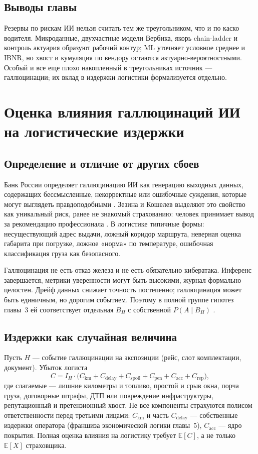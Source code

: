 \documentclass[a4paper,14pt]{extarticle}
\begin{document}
\subsection{Выводы главы}

Резервы по рискам ИИ нельзя считать тем же треугольником, что и по каско водителя. Микроданные, двухчастные модели Вербика, якорь chain-ladder и контроль актуария \cite{sabitov} образуют рабочий контур; ML уточняет условное среднее и IBNR, но хвост и кумуляция по вендору остаются актуарно-вероятностными. Особый и все еще плохо накопленный в треугольниках источник --- галлюцинации; их вклад в издержки логистики формализуется отдельно.

\section{Оценка влияния галлюцинаций ИИ на логистические издержки}

\subsection{Определение и отличие от других сбоев}

Банк России определяет галлюцинацию ИИ как генерацию выходных данных, содержащих бессмысленные, некорректные или ошибочные суждения, которые могут выглядеть правдоподобными \cite{cbr}. Зезина и Кошелев выделяют это свойство как уникальный риск, ранее не знакомый страхованию: человек принимает вывод за рекомендацию профессионала \cite{zezina}. В логистике типичные формы: несуществующий адрес выдачи, ложный коридор маршрута, неверная оценка габарита при погрузке, ложное «норма» по температуре, ошибочная классификация груза как безопасного.

Галлюцинация не есть отказ железа и не есть обязательно кибератака. Инференс завершается, метрики уверенности могут быть высокими, журнал формально целостен. Дрейф данных снижает точность постепенно; галлюцинация может быть единичным, но дорогим событием. Поэтому в полной группе гипотез главы~3 ей соответствует отдельная $B_H$ с собственной $P(A\mid B_H)$ \cite{shvedov}.

\subsection{Издержки как случайная величина}

Пусть $H$ --- событие галлюцинации на экспозиции (рейс, слот комплектации, документ). Убыток логиста
\begin{equation}
C=I_H\cdot\bigl(C_{\mathrm{km}}+C_{\mathrm{delay}}+C_{\mathrm{spoil}}+C_{\mathrm{pen}}+C_{\mathrm{acc}}+C_{\mathrm{rep}}\bigr),
\label{eq:hallc}
\end{equation}
где слагаемые --- лишние километры и топливо, простой и срыв окна, порча груза, договорные штрафы, ДТП или повреждение инфраструктуры, репутационный и претензионный хвост. Не все компоненты страхуются полисом ответственности перед третьими лицами: $C_{\mathrm{km}}$ и часть $C_{\mathrm{delay}}$ --- собственные издержки оператора (франшиза экономической логики главы~5), $C_{\mathrm{acc}}$ --- ядро покрытия. Полная оценка влияния на логистику требует $\mathbb{E}[C]$, а не только $\mathbb{E}[X]$ страховщика.
\end{document}

